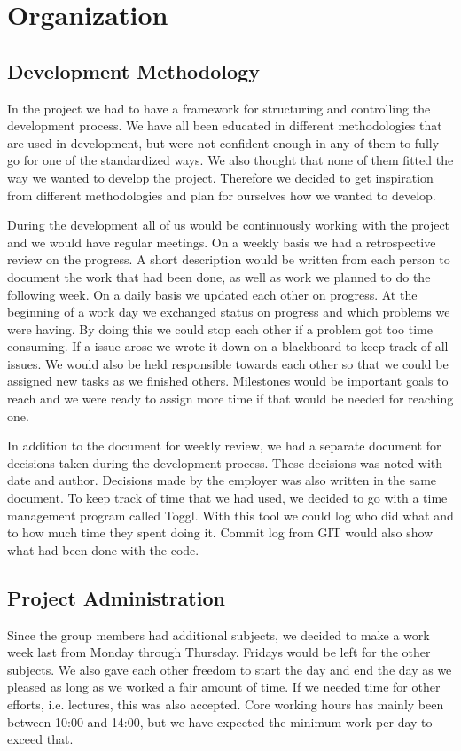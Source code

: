 \section{Organization}
\label{sec:organization}

\subsection{Development Methodology}
\label{subsec:development_methodology}
In the project we had to have a framework for structuring and controlling the
development process. We have all been educated in different methodologies that
are used in development, but were not confident enough in any of them to fully
go for one of the standardized ways. We also thought that none of them fitted 
the way we wanted to develop the project. Therefore we decided to get inspiration
from different methodologies and plan for ourselves how we wanted to develop.

During the development all of us would be continuously working with the project and we would have
regular meetings. On a weekly basis we had a retrospective review on
the progress. A short description would be written from each person to
document the work that had been done, as well as work we planned to do the
following week. On a daily basis we updated each other on progress. At
the beginning of a work day we exchanged status on progress and which
problems we were having. By doing this we could stop each other if a problem
got too time consuming. If a issue arose we wrote it down on a blackboard to keep track of all issues.
We would also be held responsible towards each other so
that we could be assigned new tasks as we finished others. Milestones would be
important goals to reach and we were ready to assign more time if that
would be needed for reaching one.

In addition to the document for weekly review, we had a separate
document for decisions taken during the development process. These decisions
was noted with date and author. Decisions made by the employer was
also written in the same document. To keep track of time that we had used,
we decided to go with a time management program called Toggl\cite{Toggl}. With this tool we
could log who did what and to how much time they spent doing it. Commit log from GIT would
also show what had been done with the code.


\subsection{Project Administration}
\label{subsec:project_administration}
Since the group members had additional subjects, we decided to make a work week
last from Monday through Thursday. Fridays would be left for the other
subjects. We also gave each other freedom to start the day and end the day as
we pleased as long as we worked a fair amount of time. If we needed time for
other efforts, i.e. lectures, this was also accepted. Core working hours has
mainly been between 10:00 and 14:00, but we have expected the minimum work per
day to exceed that.


